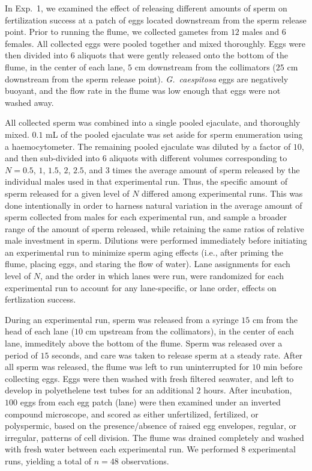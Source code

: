 \documentclass{article}
\begin{document}
	In Exp.~1, we examined the effect of releasing different amounts of sperm on fertilization success at a patch of eggs located downstream from the sperm release point. Prior to running the flume, we collected gametes from $12$ males and $6$ females. All collected eggs were pooled together and mixed thoroughly. Eggs were then divided into $6$ aliquots that were gently released onto the bottom of the flume, in the center of each lane, $5$ cm downstream from the collimators ($25$ cm downstream from the sperm release point). \textit{G.~caespitosa} eggs are negatively buoyant, and the flow rate in the flume was low enough that eggs were not washed away. 

	All collected sperm was combined into a single pooled ejaculate, and thoroughly mixed. $0.1$ mL of the pooled ejaculate was set aside for sperm enumeration using a haemocytometer. The remaining pooled ejaculate was diluted by a factor of $10$, and then sub-divided into $6$ aliquots with different volumes corresponding to $N = 0.5$, $1$, $1.5$, $2$, $2.5$, and $3$ times the average amount of sperm released by the individual males used in that experimental run. Thus, the specific amount of sperm released for a given level of $N$ differed among experimental runs. This was done intentionally in order to harness natural variation in the average amount of sperm collected from males for each experimental run, and sample a broader range of the amount of sperm released, while retaining the same ratios of relative male investment in sperm. Dilutions were performed immediately before initiating an experimental run to minimize sperm aging effects (i.e., after priming the flume, placing eggs, and staring the flow of water). Lane assignments for each level of $N$, and the order in which lanes were run, were randomized for each experimental run to account for any lane-specific, or lane order, effects on fertlization success. 

	During an experimental run, sperm was released from a syringe $15$ cm from the head of each lane ($10$ cm upstream from the collimators), in the center of each lane, immeditely above the bottom of the flume. Sperm was released over a period of $15$ seconds, and care was taken to release sperm at a steady rate. After all sperm was released, the flume was left to run uninterrupted for $10$ min before collecting eggs. Eggs were then washed with fresh filtered seawater, and left to develop in polyethelene test tubes for an additional $2$ hours. After incubation, $100$ eggs from each egg patch (lane) were then examined under an inverted compound microscope, and scored as either unfertilized, fertilized, or polyspermic, based on the presence/absence of raised egg envelopes, regular, or irregular, patterns of cell division. The flume was drained completely and washed with fresh water between each experimental run. We performed $8$ experimental runs, yielding a total of $n=48$ observations.
\end{document}
